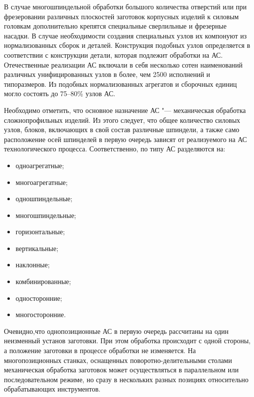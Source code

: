 В случае многошпиндельной обработки большого количества отверстий или при фрезеровании различных плоскостей заготовок корпусных изделий к силовым головкам дополнительно крепятся специальные сверлильные и фрезерные насадки. В случае необходимости создания специальных узлов их компонуют из нормализованных сборок и деталей. Конструкция подобных узлов определяется в соответствии с конструкции детали, которая подлежит обработки на АС. Отечественные реализации АС включали в себя несколько сотен наименований различных унифицированных узлов в более, чем 2500 исполнений и типоразмеров. Из подобных нормализованных агрегатов и сборочных единиц могло состоять до 75--80\% узлов АС.

Необходимо отметить, что основное назначение АС "--- механическая обработка сложнопрофильных изделий. Из этого следует, что общее количество силовых узлов, блоков, включающих в свой состав различные шпиндели, а также само расположение осей шпинделей в первую очередь зависят от реализуемого на АС технологического процесса. Соответственно, по типу АС разделяются на: 

\begin{itemize}
	\item одноагрегатные;
	\item многоагрегатные;
	\item одношпиндельные;
	\item многошпиндельные;
	\item горизонтальные;
	\item вертикальные;
	\item наклонные;
	\item комбинированные;
	\item односторонние;
	\item многосторонние.
\end{itemize}

Очевидно,что однопозиционные АС в первую очередь рассчитаны на один неизменный установ заготовки. При этом обработка происходит с одной стороны, а положение заготовки в процессе обработки не изменяется. На многопозиционных станках, оснащенных поворотно-делительными столами механическая обработка заготовок может осуществляться в параллельном или последовательном режиме, но сразу в нескольких разных позициях относительно обрабатывающих инструментов.

